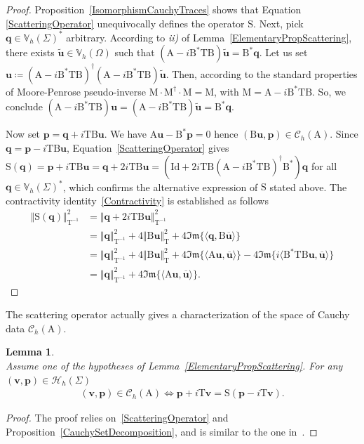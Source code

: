 \documentclass[a4paper,11pt]{article}
\newcommand{\mA}{\mathrm{A}}
\newcommand{\mB}{\mathrm{B}}
\newcommand{\mM}{\mathrm{M}}
\newcommand{\Id}{\mathrm{Id}}
\newcommand{\mT}{\mathrm{T}}
\newcommand{\mS}{\mathrm{S}}
\newcommand{\mbV}{\mathbb{V}}
\newcommand{\bp}{\boldsymbol{p}}
\newcommand{\bu}{\boldsymbol{u}}
\newcommand{\bv}{\boldsymbol{v}}
\newcommand{\bq}{\boldsymbol{q}}
\renewcommand{\Im}{\mathfrak{Im}} %
\newtheorem{lem}[defn]{Lemma}
\begin{document}
\begin{proof}
Proposition~\ref{IsomorphismCauchyTraces} shows that Equation
\eqref{ScatteringOperator} unequivocally defines the operator
$\mS$. Next, pick $\bq\in\mbV_h(\Sigma)^{*}$ arbitrary. According to
\textit{ii)} of Lemma~\ref{ElementaryPropScattering}, there exists
$\tilde{\bu}\in \mbV_h(\Omega)$ such that
$(\mA-i\mB^*\mT\mB)\tilde{\bu} = \mB^{*}\bq$. Let us set $\bu\coloneq
(\mA-i\mB^*\mT\mB)^{\dagger}(\mA-i\mB^*\mT\mB)\tilde{\bu}$. Then,
according to the standard properties of Moore-Penrose pseudo-inverse
$\mM\cdot\mM^{\dagger}\cdot\mM = \mM$, with $\mM = \mA-i\mB^*\mT\mB$.
So, we conclude $(\mA-i\mB^*\mT\mB)\bu = (\mA-i\mB^*\mT\mB)\tilde{\bu} = \mB^*\bq$.

Now set $\bp = \bq + i\mT\mB\bu$. We have $\mA\bu - \mB^*\bp
= 0$ hence $(\mB\bu,\bp)\in\mathscr{C}_h(\mA)$. Since $\bq
= \bp - i\mT\mB\bu$, Equation~\eqref{ScatteringOperator} gives $\mS(\bq) = \bp  +i\mT\mB\bu = \bq + 2i\mT\mB\bu
= (\Id + 2i\mT\mB(\mA-i\mB^*\mT\mB)^{\dagger}\mB^*)\bq$ for all
$\bq\in \mbV_h(\Sigma)^*$, which confirms the alternative
expression of $\mS$ stated above. The contractivity identity~\eqref{Contractivity} is established as follows
\begin{equation*}
  \begin{aligned}
    \Vert \mS(\bq)\Vert_{\mT^{-1}}^{2} 
    & = \Vert \bq + 2i\mT\mB\bu \Vert_{\mT^{-1}}^{2}\\
    & = \Vert \bq\Vert_{\mT^{-1}}^{2} + 4\Vert \mB\bu\Vert_{\mT}^{2} +
    4\Im\{\langle \bq,\mB\overline{\bu}\rangle\}\\
    & = \Vert \bq\Vert_{\mT^{-1}}^{2} + 4\Vert \mB\bu\Vert_{\mT}^{2} +
    4\Im\{\langle \mA\bu,\overline{\bu}\rangle\} - 4\Im\{i\langle \mB^*\mT\mB\bu,\overline{\bu}\rangle \} \\
    & = \Vert \bq\Vert_{\mT^{-1}}^{2}+4\Im\{\langle \mA\bu,\overline{\bu}\rangle\}.
  \end{aligned}
\end{equation*}
\end{proof}

\noindent 
The scattering operator actually gives a characterization of the space of Cauchy data \(\mathscr{C}_h(\mA)\).

\begin{lem}\label{ScatteringOperatorChara}\quad\\
  Assume one of the hypotheses of Lemma~\ref{ElementaryPropScattering}. For any \((\bv,\bp)\in \mathscr{H}_h(\Sigma)\)
  \begin{align*}
    (\bv,\bp)\in \mathscr{C}_h(\mA) \Longleftrightarrow \bp+i\mT\bv = \mS(\bp-i\mT\bv). 
  \end{align*}
\end{lem}
\begin{proof}
  The proof relies on~\eqref{ScatteringOperator} and Proposition~\ref{CauchySetDecomposition}, and is similar to the one in~\cite[Lemma 7.3]{MR4665035}.
\end{proof}
\end{document}
